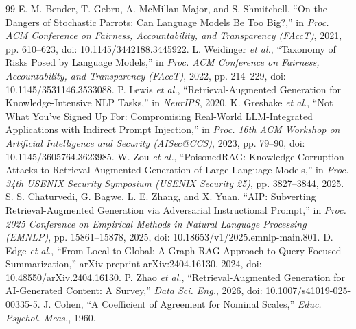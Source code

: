 ﻿\documentclass[a4paper,12pt]{article}
\begin{document}
\begin{thebibliography}{99}
 E. M. Bender, T. Gebru, A. McMillan-Major, and S. Shmitchell, ``On the Dangers of Stochastic Parrots: Can Language Models Be Too Big?,'' in \emph{Proc. ACM Conference on Fairness, Accountability, and Transparency (FAccT)}, 2021, pp. 610--623, doi: 10.1145/3442188.3445922.
 L. Weidinger \emph{et al.}, ``Taxonomy of Risks Posed by Language Models,'' in \emph{Proc. ACM Conference on Fairness, Accountability, and Transparency (FAccT)}, 2022, pp. 214--229, doi: 10.1145/3531146.3533088.
 P. Lewis \emph{et al.}, ``Retrieval-Augmented Generation for Knowledge-Intensive NLP Tasks,'' in \emph{NeurIPS}, 2020.
 K. Greshake \emph{et al.}, ``Not What You've Signed Up For: Compromising Real-World LLM-Integrated Applications with Indirect Prompt Injection,'' in \emph{Proc. 16th ACM Workshop on Artificial Intelligence and Security (AISec@CCS)}, 2023, pp. 79--90, doi: 10.1145/3605764.3623985.
 W. Zou \emph{et al.}, ``PoisonedRAG: Knowledge Corruption Attacks to Retrieval-Augmented Generation of Large Language Models,'' in \emph{Proc. 34th USENIX Security Symposium (USENIX Security 25)}, pp. 3827--3844, 2025.
 S. S. Chaturvedi, G. Bagwe, L. E. Zhang, and X. Yuan, ``AIP: Subverting Retrieval-Augmented Generation via Adversarial Instructional Prompt,'' in \emph{Proc. 2025 Conference on Empirical Methods in Natural Language Processing (EMNLP)}, pp. 15861--15878, 2025, doi: 10.18653/v1/2025.emnlp-main.801.
 D. Edge \emph{et al.}, ``From Local to Global: A Graph RAG Approach to Query-Focused Summarization,'' arXiv preprint arXiv:2404.16130, 2024, doi: 10.48550/arXiv.2404.16130.
 P. Zhao \emph{et al.}, ``Retrieval-Augmented Generation for AI-Generated Content: A Survey,'' \emph{Data Sci. Eng.}, 2026, doi: 10.1007/s41019-025-00335-5.
 J. Cohen, ``A Coefficient of Agreement for Nominal Scales,'' \emph{Educ. Psychol. Meas.}, 1960.
\end{thebibliography}
\end{document}
